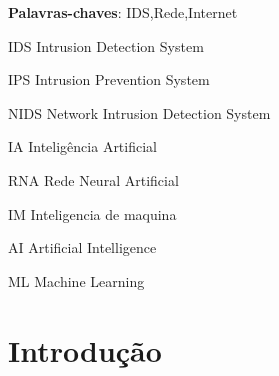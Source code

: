 \documentclass[
	12pt,				%
	openright,			%
	oneside,
	a4paper,			%
	english,			%
	french,				%
	spanish,			%
	brazil				%
	]{abntex2}
\begin{document}
\frenchspacing 


\imprimircapa

\imprimirfolhaderosto%


\setlength{\absparsep}{18pt} %
\begin{resumo}
   
 \textbf{Palavras-chaves}: IDS,Rede,Internet
\end{resumo}



\begin{siglas}
  \item[IDS] Intrusion Detection System
  \item[IPS] Intrusion Prevention System
  \item[NIDS] Network Intrusion Detection System
  \item[IA] Inteligência Artificial
  \item[RNA] Rede Neural Artificial
  \item[IM] Inteligencia de maquina
  \item[AI] Artificial Intelligence
  \item[ML] Machine Learning
\end{siglas}

\tableofcontents*
\cleardoublepage

\textual

\chapter[Introdução]{Introdução}
\end{document}
